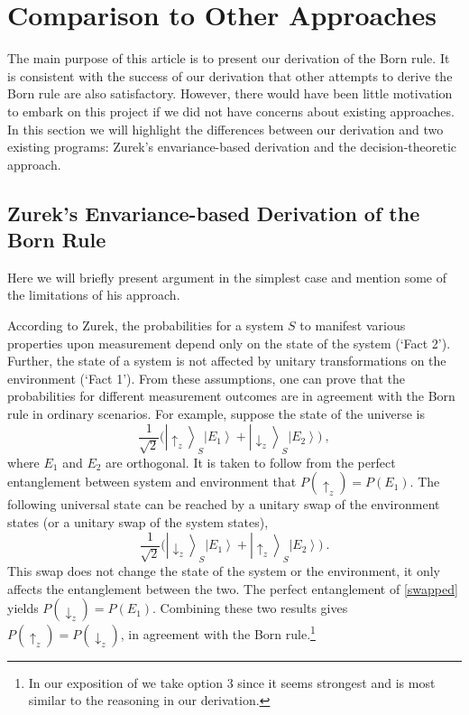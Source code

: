 \documentclass[onecolumn,secnumarabic,amsmath,amssymb,balancelastpage,nofootinbib]{article}
\newcommand{\ket}[1]{\ensuremath{\left|#1\right\rangle}}
\begin{document}
\section{Comparison to Other Approaches}\label{review}

The main purpose of this article is to present our derivation of the Born rule.  It is consistent with the success of our derivation that other attempts to derive the Born rule are also satisfactory. However, there would have been little motivation to embark on this project if we did not have concerns about existing approaches. In this section we will highlight the differences between our derivation and two existing programs: Zurek's envariance-based derivation and the decision-theoretic approach.

\subsection{Zurek's Envariance-based Derivation of the Born Rule}

Here we will briefly present  \citeyearpar{zurek2005} argument in the simplest case and mention some of the limitations of his approach.

According to Zurek, the probabilities for a system $S$ to manifest various properties upon measurement depend only on the state of the system (`Fact 2').  Further, the state of a system is not affected by unitary transformations on the environment (`Fact 1').  From these assumptions, one can prove that the probabilities for different measurement outcomes are in agreement with the Born rule in ordinary scenarios.  For example, suppose the state of the universe is 
\begin{equation}
\frac{1}{\sqrt{2}}\Big(\ket{\uparrow_z}_S\ket{E_1}+\ket{\downarrow_z}_S\ket{E_2}\Big)\ ,
\end{equation}
where $E_1$ and $E_2$ are orthogonal.  It {is taken to follow} from the perfect entanglement between system and environment that $P(\uparrow_z)=P(E_1)$.  The following universal state can be reached by a unitary swap of the environment states (or a unitary swap of the system states), 
\begin{equation}
\frac{1}{\sqrt{2}}\Big(\ket{\downarrow_z}_S\ket{E_1}+\ket{\uparrow_z}_S\ket{E_2}\Big)\ .
\label{swapped}
\end{equation}
This swap does not change the state of the system or the environment, it only affects the entanglement between the two.  The perfect entanglement of \eqref{swapped} yields $P(\downarrow_z)=P(E_1)$.  Combining these two results gives $P(\uparrow_z)=P(\downarrow_z)$, in agreement with the Born rule.\footnote{In our exposition of \citep[\textsection II.C]{zurek2005} we take option 3 since it seems strongest and is most similar to the reasoning in our derivation.}
\end{document}
